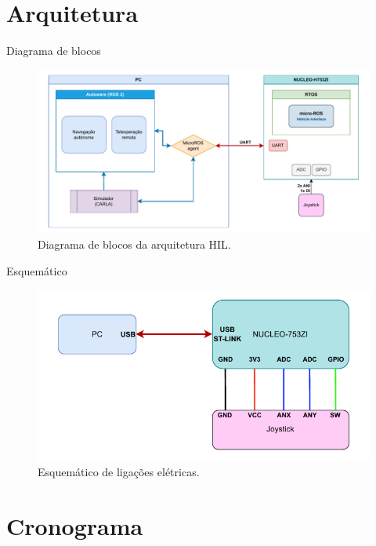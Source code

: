 \documentclass{if-beamer}
\begin{document}
\section{Arquitetura}

\begin{frame}{Diagrama de blocos}


	\begin{figure}
		\centering
		\includegraphics[width=\linewidth]{img/block_diagram.pdf}
		\caption{Diagrama de blocos da arquitetura HIL.}
		\label{fig:blockdiagram}
	\end{figure}
	

\end{frame}


\begin{frame}{Esquemático}
	
		
	\begin{figure}
		\centering
		\includegraphics[width=\linewidth]{img/esquematico.pdf}
		\caption{Esquemático de ligações elétricas.}
		\label{fig:esquematico}
	\end{figure}
	
\end{frame}



\section{Cronograma}
\end{document}
